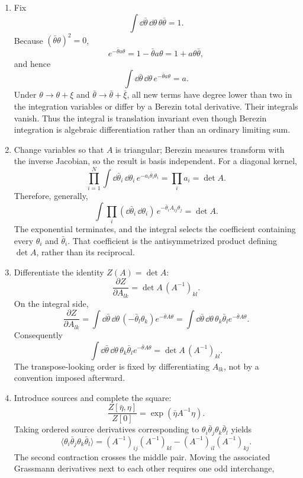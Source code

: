 \begin{enumerate}
\begin{enumerate}
\item
Fix
\[
 \int \dd\bar\theta\,\dd\theta\,\theta\bar\theta=1.
\]
Because \((\bar\theta\theta)^2=0\),
\[
 e^{-\bar\theta a\theta}
 =1-\bar\theta a\theta
 =1+a\theta\bar\theta,
\]
and hence
\[
 \int \dd\bar\theta\,\dd\theta\,
 e^{-\bar\theta a\theta}=a.
\]
Under \(\theta\to\theta+\xi\) and
\(\bar\theta\to\bar\theta+\bar\xi\), all new terms have degree lower than
two in the integration variables or differ by a Berezin total derivative.
Their integrals vanish.  Thus the integral is translation invariant even
though Berezin integration is algebraic differentiation rather than an
ordinary limiting sum.
\item
Change variables so that \(A\) is triangular; Berezin measures transform
with the inverse Jacobian, so the result is basis independent.  For a
diagonal kernel,
\[
 \prod_{i=1}^N\int \dd\bar\theta_i\,\dd\theta_i\,
 e^{-a_i\bar\theta_i\theta_i}
 =\prod_i a_i=\det A.
\]
Therefore, generally,
\[
 \boxed{\quad
 \int\prod_i(\dd\bar\theta_i\,\dd\theta_i)\,
 e^{-\bar\theta_iA_{ij}\theta_j}=\det A.
 \quad}
\]
The exponential terminates, and the integral selects the coefficient
containing every \(\theta_i\) and \(\bar\theta_i\).  That coefficient is the
antisymmetrized product defining \(\det A\), rather than its reciprocal.
\item
Differentiate the identity \(Z(A)=\det A\):
\[
 \frac{\partial Z}{\partial A_{lk}}
 =\det A\,(A^{-1})_{kl}.
\]
On the integral side,
\[
 \frac{\partial Z}{\partial A_{lk}}
 =\int \dd\bar\theta\,\dd\theta\,
 (-\bar\theta_l\theta_k)e^{-\bar\theta A\theta}
 =\int \dd\bar\theta\,\dd\theta\,
 \theta_k\bar\theta_l e^{-\bar\theta A\theta}.
\]
Consequently
\[
 \boxed{\quad
 \int \dd\bar\theta\,\dd\theta\,
 \theta_k\bar\theta_l e^{-\bar\theta A\theta}
 =\det A\,(A^{-1})_{kl}.
 \quad}
\]
The transpose-looking order is fixed by differentiating \(A_{lk}\), not
by a convention imposed afterward.
\item
Introduce sources and complete the square:
\[
 \frac{Z[\bar\eta,\eta]}{Z[0]}
 =\exp(\bar\eta A^{-1}\eta).
\]
Taking ordered source derivatives corresponding to
\(\theta_i\bar\theta_j\theta_k\bar\theta_l\) yields
\[
 \boxed{\quad
 \langle\theta_i\bar\theta_j\theta_k\bar\theta_l\rangle
 =(A^{-1})_{ij}(A^{-1})_{kl}
 -(A^{-1})_{il}(A^{-1})_{kj}.
 \quad}
\]
The second contraction crosses the middle pair.  Moving the associated
Grassmann derivatives next to each other requires one odd interchange,

\end{enumerate}
\end{enumerate}
